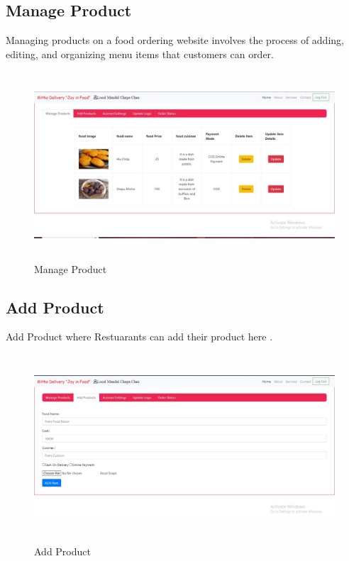 \subsection{Manage Product}
Managing products on a food ordering website involves the process of adding, editing, and organizing menu items that customers can order.
\begin{figure}[h]
    \centering
    \includegraphics[height=7cm]{img/Graphics/hotel manage product.JPG}
    \caption{Manage Product}
\end{figure}

\subsection{Add Product}
Add Product where Restuarants can add their product here .
\begin{figure}[h]
    \centering
    \includegraphics[height=7cm]{img/Graphics/hotel add product.JPG}
    \caption{Add Product}
\end{figure}

\newpage
